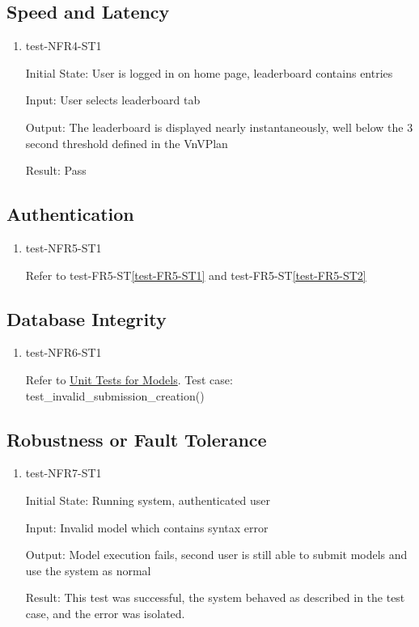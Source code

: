 \documentclass[12pt, titlepage]{article}
\begin{document}
\subsection{Speed and Latency}
\begin{enumerate}
\item{test-NFR4-ST1} \label{test-NFR4-ST1}

Initial State: User is logged in on home page, leaderboard contains entries

Input: User selects leaderboard tab

Output: The leaderboard is displayed nearly instantaneously, well below the 3 second threshold defined in the VnVPlan

Result: Pass

\end{enumerate}
\subsection{Authentication}
\begin{enumerate}
\item{test-NFR5-ST1} \label{test-NFR5-ST1}

Refer to test-FR5-ST\ref{test-FR5-ST1} and test-FR5-ST\ref{test-FR5-ST2}
\end{enumerate}
\subsection{Database Integrity}
\begin{enumerate}
\item{test-NFR6-ST1} \label{test-NFR6-ST1}

Refer to \href{https://github.com/AidanMariglia/SOCAlgoTestPlatform/blob/main/src/webserver/webserver/submissions/tests.py}{Unit Tests for Models}. Test case: test\_invalid\_submission\_creation() 

\end{enumerate}
\subsection{Robustness or Fault Tolerance}
\begin{enumerate}
\item{test-NFR7-ST1} \label{test-NFR7-ST1}


Initial State: Running system, authenticated user

Input: Invalid model which contains syntax error

Output: Model execution fails, second user is still able to submit models and use the system as normal

Result: This test was successful, the system behaved as described in the test case, and the error was isolated.

\end{enumerate}
\end{document}
